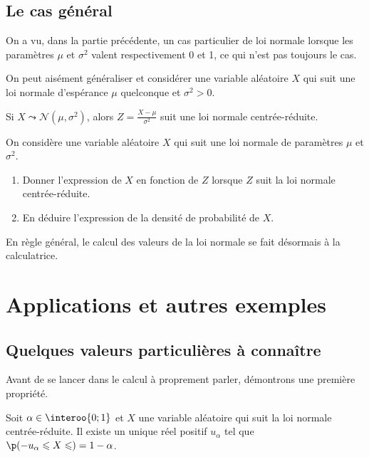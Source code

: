 \documentclass[11pt,a4paper,french]{article}
\begin{document}
\subsection{Le cas général}

On a vu, dans la partie précédente, un cas particulier de loi normale
lorsque les paramètres $\mu$ et $\sigma^2$ valent respectivement 0 et 1,
ce qui n'est pas toujours le cas.

On peut aisément généraliser et considérer une variable aléatoire $X$
qui suit une loi normale d'espérance $\mu$ quelconque et $\sigma^2 > 0$.

\begin{propriete}
  Si $X \leadsto \mathcal{N}(\mu,\sigma^2)$, alors $Z = \frac{ X -
  \mu}{\sigma^2}$ suit une loi normale centrée-réduite.
\end{propriete}

\begin{exercice}
  On considère une variable aléatoire $X$ qui suit une loi normale de
  paramètres $\mu$ et $\sigma^2$.
  \begin{enumerate}
    \item Donner l'expression de $X$ en fonction de $Z$ lorsque $Z$ suit
      la loi normale centrée-réduite.
    \item En déduire l'expression de la densité de probabilité de $X$.
  \end{enumerate}
\end{exercice}

En règle général, le calcul des valeurs de la loi normale se fait
désormais à la calculatrice.

\section{Applications et autres exemples}

\subsection{Quelques valeurs particulières à connaître}

Avant de se lancer dans le calcul à proprement parler, démontrons une
première propriété.

\begin{propriete}
  Soit $\alpha \in \interoo{0;1}$ et $X$ une variable aléatoire qui suit
  la loi normale centrée-réduite. Il existe un unique réel positif
  $u_{\alpha}$ tel que $\p(-u_{\alpha} \leqslant X \leqslant) = 1 -
  \alpha$.
\end{propriete}
\end{document}
